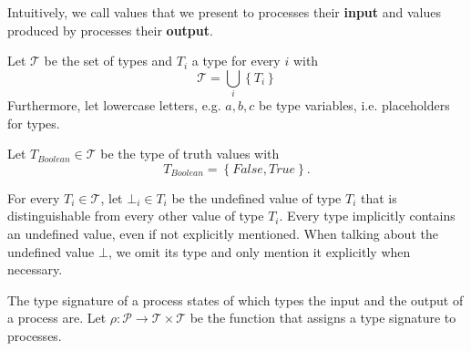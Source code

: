 Intuitively, we call values that we present to processes their \textbf{input} and values produced by processes their \textbf{output}.



\begin{definition}
Let $\mathcal{T}$ be the set of types and $T_i$ a type for every $i$ with
\begin{equation*}
  \mathcal{T} = \bigcup_i \left\{ T_i \right\}
\end{equation*}
Furthermore, let lowercase letters, e.g. $a, b, c$ be type variables, i.e. placeholders for types.

\hfill\qedsymbol
\end{definition}

\begin{definition}
Let $T_{Boolean} \in \mathcal{T}$ be the type of truth values with
\begin{equation*}
  T_{Boolean} = \left\{False, True \right\}.
\end{equation*}

\hfill\qedsymbol
\end{definition}

\begin{definition}
For every $T_i \in \mathcal{T}$, let $\bot_i \in T_i$ be the undefined value of type $T_i$ that is distinguishable from every other value of type $T_i$. Every type implicitly contains an undefined value, even if not explicitly mentioned. When talking about the undefined value $\bot$, we omit its type and only mention it explicitly when necessary.

\hfill\qedsymbol
\end{definition}


\begin{definition}
\label{def:type_signature}
The type signature of a process states of which types the input and the output of a process are. Let $\rho \colon \mathcal{P} \to \mathcal{T} \times \mathcal{T}$ be the function that assigns a type signature to processes.

\hfill\qedsymbol
\end{definition}

